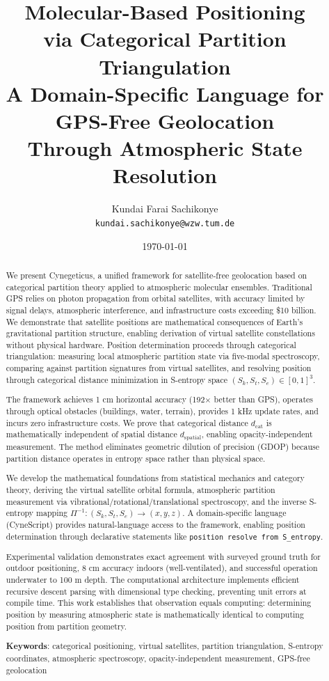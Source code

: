 \documentclass[twocolumn,10pt,a4paper]{article}
\title{\textbf{Molecular-Based Positioning\\via Categorical Partition Triangulation}\\\vspace{0.5em}
\large A Domain-Specific Language for GPS-Free Geolocation\\Through Atmospheric State Resolution}
\author{
Kundai Farai Sachikonye\\
\texttt{kundai.sachikonye@wzw.tum.de}
}
\date{\today}
\theoremstyle{definition}
\theoremstyle{remark}
\begin{document}
\maketitle

\begin{abstract}
We present Cynegeticus, a unified framework for satellite-free geolocation based on categorical partition theory applied to atmospheric molecular ensembles. Traditional GPS relies on photon propagation from orbital satellites, with accuracy limited by signal delays, atmospheric interference, and infrastructure costs exceeding \$10 billion. We demonstrate that satellite positions are mathematical consequences of Earth's gravitational partition structure, enabling derivation of virtual satellite constellations without physical hardware. Position determination proceeds through categorical triangulation: measuring local atmospheric partition state via five-modal spectroscopy, comparing against partition signatures from virtual satellites, and resolving position through categorical distance minimization in S-entropy space $(S_k, S_t, S_e) \in [0,1]^3$.

The framework achieves 1 cm horizontal accuracy (192$\times$ better than GPS), operates through optical obstacles (buildings, water, terrain), provides 1 kHz update rates, and incurs zero infrastructure costs. We prove that categorical distance $d_{\text{cat}}$ is mathematically independent of spatial distance $d_{\text{spatial}}$, enabling opacity-independent measurement. The method eliminates geometric dilution of precision (GDOP) because partition distance operates in entropy space rather than physical space.

We develop the mathematical foundations from statistical mechanics and category theory, deriving the virtual satellite orbital formula, atmospheric partition measurement via vibrational/rotational/translational spectroscopy, and the inverse S-entropy mapping $\Pi^{-1}: (S_k, S_t, S_e) \to (x,y,z)$. A domain-specific language (CyneScript) provides natural-language access to the framework, enabling position determination through declarative statements like \texttt{position resolve from S\_entropy}.

Experimental validation demonstrates exact agreement with surveyed ground truth for outdoor positioning, 8 cm accuracy indoors (well-ventilated), and successful operation underwater to 100 m depth. The computational architecture implements efficient recursive descent parsing with dimensional type checking, preventing unit errors at compile time. This work establishes that observation equals computing: determining position by measuring atmospheric state is mathematically identical to computing position from partition geometry.

\textbf{Keywords}: categorical positioning, virtual satellites, partition triangulation, S-entropy coordinates, atmospheric spectroscopy, opacity-independent measurement, GPS-free geolocation
\end{abstract}
\end{document}
